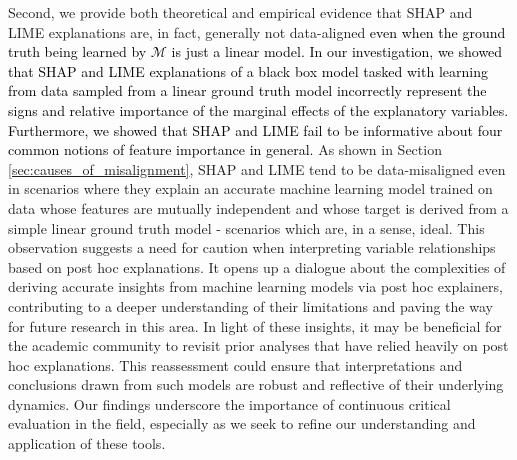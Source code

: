 \documentclass[mnsc,blindrev]{informs3}
\begin{document}
       Second, we provide both theoretical and empirical evidence that SHAP and LIME explanations are, in fact, generally not data-aligned \textcolor{black}{even when the ground truth being learned by $\mathcal{M}$ is just a linear model. In our investigation, we showed that SHAP and LIME explanations of a black box model tasked with learning from data sampled from a linear ground truth model incorrectly represent the signs and relative importance of the marginal effects of the explanatory variables. Furthermore, we showed that SHAP and LIME fail to be informative about four common notions of feature importance in general.} As shown in Section \ref{sec:causes_of_misalignment}, SHAP and LIME tend to be data-misaligned even in scenarios where they explain an accurate machine learning model trained on data whose features are mutually independent and whose target is derived from a simple linear ground truth model - scenarios which are, in a sense, ideal. This observation suggests a need for caution when interpreting variable relationships based on post hoc explanations. It opens up a dialogue about the complexities of deriving accurate insights from machine learning models via post hoc explainers, contributing to a deeper understanding of their limitations and paving the way for future research in this area. In light of these insights, it may be beneficial for the academic community to revisit prior analyses that have relied heavily on post hoc explanations. This reassessment could ensure that interpretations and conclusions drawn from such models are robust and reflective of their underlying dynamics. Our findings underscore the importance of continuous critical evaluation in the field, especially as we seek to refine our understanding and application of these tools. 
        
\end{document}
